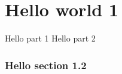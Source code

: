 \documentclass{article}
\begin{document}
\part{Hello world 1}

Hello part 1 \cite{DigitalPublishingLibraries}
Hello part 2

\section*{Hello section 1.2}

\end{document}
